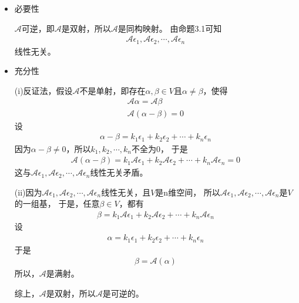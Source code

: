 \documentclass{article}
\begin{document}
\begin{itemize}
  \item 必要性

        $\mathscr{A}$可逆，即$\mathscr{A}$是双射，所以$\mathscr{A}$是同构映射。
        由命题3.1可知
        \begin{align*}
          \mathscr{A}\epsilon_1, \mathscr{A}\epsilon_2, \cdots, \mathscr{A}\epsilon_n
        \end{align*}
        线性无关。

  \item 充分性

        (i)反证法，假设$\mathscr{A}$不是单射，即存在$\alpha, \beta \in V$且$\alpha \neq \beta$，使得
        \begin{align*}
          \mathscr{A} \alpha = \mathscr{A} \beta \\
          \mathscr{A}(\alpha - \beta) = 0
        \end{align*}
        设
        \begin{align*}
          \alpha - \beta = k_1 \epsilon_1 + k_2 \epsilon_2 + \cdots + k_n \epsilon_n
        \end{align*}
        因为$\alpha - \beta \neq 0$，所以$k_1, k_2, \cdots, k_n$不全为0，
        于是
        \begin{align*}
          \mathscr{A}(\alpha - \beta) = k_1 \mathscr{A}\epsilon_1 + k_2 \mathscr{A}\epsilon_2 + \cdots + k_n \mathscr{A}\epsilon_n = 0
        \end{align*}
        这与$\mathscr{A}\epsilon_1, \mathscr{A}\epsilon_2, \cdots, \mathscr{A}\epsilon_n$线性无关矛盾。

        (ii)因为$\mathscr{A}\epsilon_1, \mathscr{A}\epsilon_2, \cdots, \mathscr{A}\epsilon_n$线性无关，且$V$是n维空间，
        所以$\mathscr{A}\epsilon_1, \mathscr{A}\epsilon_2, \cdots, \mathscr{A}\epsilon_n$是$V$的一组基，
        于是，任意$\beta \in V$，都有
        \begin{align*}
          \beta = k_1 \mathscr{A}\epsilon_1 + k_2 \mathscr{A}\epsilon_2 + \cdots + k_n \mathscr{A}\epsilon_n
        \end{align*}
        设
        \begin{align*}
          \alpha = k_1 \epsilon_1 + k_2 \epsilon_2 + \cdots + k_n \epsilon_n
        \end{align*}
        于是
        \begin{align*}
          \beta = \mathscr{A}(\alpha)
        \end{align*}
        所以，$\mathscr{A}$是满射。

        综上，$\mathscr{A}$是双射，所以$\mathscr{A}$是可逆的。

\end{itemize}
\end{document}

